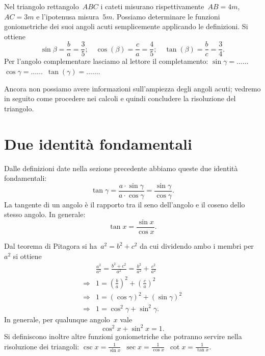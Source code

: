  \begin{esempio}
Nel triangolo rettangolo~$ABC$ i cateti misurano 
rispettivamente~$AB=4\unit{m}$, 
$AC=3\unit{m}$ e l'ipotenusa misura~$5\unit{m}$.
Possiamo determinare le funzioni goniometriche dei suoi angoli acuti 
semplicemente applicando le definizioni.
Si ottiene
\[\sin \beta =\frac{b}{a}=\frac{3}{5};\quad \cos (\beta 
)=\frac{c}{a}=\frac{4}{5};\quad \tan (\beta )=\frac{b}{c}=\frac{3}{4}.\]
Per l'angolo complementare lasciamo al lettore il completamento:
$\sin \gamma =\ldots\ldots$\quad~$\cos \gamma 
=\ldots\ldots$\quad~$\tan(\gamma 
)=\ldots\ldots$\quad.
 \end{esempio}

\osservazione Ancora non possiamo avere informazioni sull'ampiezza degli 
angoli 
acuti;
vedremo in seguito come procedere nei calcoli e quindi concludere la 
risoluzione 
del triangolo.


\section{Due identità fondamentali}
\label{sec:trigo_identita}

Dalle definizioni date nella sezione precedente abbiamo queste due identità 
fondamentali:
\[\tan \gamma=\frac{a\cdot \sin \gamma}{a\cdot \cos \gamma}=
\frac{\sin \gamma}{\cos \gamma}.\]
La tangente di un angolo è il rapporto tra il seno dell'angolo e il coseno 
dello 
stesso angolo. In generale:
 \begin{equation}
 \tan x=\frac{\sin x}{\cos x}.
 \end{equation}

Dal teorema di Pitagora si ha~$a^{2}=b^{2}+c^{2}$ da cui dividendo ambo i 
membri 
per~$a^{2}$ si ottiene
\begin{align*}
&\frac{a^{2}}{a^{2}}=\frac{b^{2}+c^{2}}{a^{2}}=
\frac{b^{2}}{a^{2}}+\frac{c^{2}}{a^{2}}\\
\Rightarrow & 1=\left(\frac{b}{a}\right)^{2}+\left(\frac{c}{a}\right)^{2}\\
\Rightarrow & 1=\left(\cos \gamma\right)^{2}+\left(\sin \gamma\right)^{2}\\
\Rightarrow & 1=\cos^{2} \gamma+\sin^{2} \gamma.
\end{align*}
In generale, per qualunque angolo~$x$ vale
\begin{equation}
\label{eq:F.2}
 \cos^{2}x+\sin^{2}x=1.
\end{equation}
Si definiscono inoltre altre funzioni goniometriche che potranno servire 
nella 
risoluzione dei triangoli:
$\csc x=\frac{1}{\sin x}$\quad~$\sec x=\frac{1}{\cos x}$\quad~$\cot x=
\frac{1}{\tan x}$.


